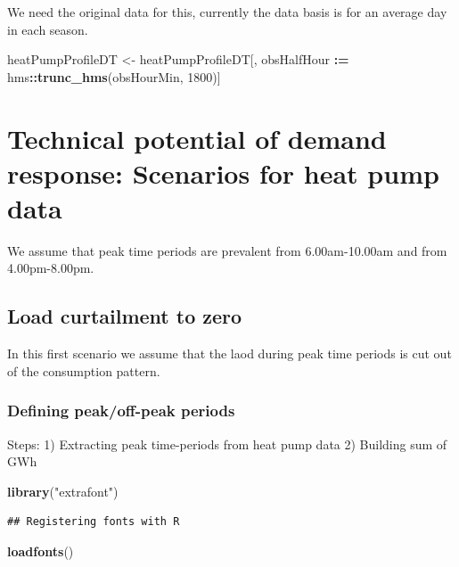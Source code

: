 \documentclass[]{article}
\newenvironment{Shaded}{\begin{snugshade}}{\end{snugshade}}
\newcommand{\KeywordTok}[1]{\textcolor[rgb]{0.13,0.29,0.53}{\textbf{#1}}}
\newcommand{\DecValTok}[1]{\textcolor[rgb]{0.00,0.00,0.81}{#1}}
\newcommand{\StringTok}[1]{\textcolor[rgb]{0.31,0.60,0.02}{#1}}
\newcommand{\OperatorTok}[1]{\textcolor[rgb]{0.81,0.36,0.00}{\textbf{#1}}}
\newcommand{\ErrorTok}[1]{\textcolor[rgb]{0.64,0.00,0.00}{\textbf{#1}}}
\newcommand{\NormalTok}[1]{#1}
\theoremstyle{definition}
\theoremstyle{definition}
\theoremstyle{definition}
\theoremstyle{remark}
\begin{document}
We need the original data for this, currently the data basis is for an
average day in each season.

\begin{Shaded}
\begin{Highlighting}[]
\NormalTok{heatPumpProfileDT <-}\StringTok{ }\NormalTok{heatPumpProfileDT[, obsHalfHour }\OperatorTok{:}\ErrorTok{=}\StringTok{ }\NormalTok{hms}\OperatorTok{::}\KeywordTok{trunc_hms}\NormalTok{(obsHourMin, }\DecValTok{1800}\NormalTok{)]}
\end{Highlighting}
\end{Shaded}

\section{Technical potential of demand response: Scenarios for heat pump
data}\label{technical-potential-of-demand-response-scenarios-for-heat-pump-data}

We assume that peak time periods are prevalent from 6.00am-10.00am and
from 4.00pm-8.00pm.

\subsection{Load curtailment to zero}\label{load-curtailment-to-zero}

In this first scenario we assume that the laod during peak time periods
is cut out of the consumption pattern.

\subsubsection{Defining peak/off-peak
periods}\label{defining-peakoff-peak-periods}

Steps: 1) Extracting peak time-periods from heat pump data 2) Building
sum of GWh

\begin{Shaded}
\begin{Highlighting}[]
\KeywordTok{library}\NormalTok{(}\StringTok{"extrafont"}\NormalTok{)}
\end{Highlighting}
\end{Shaded}

\begin{verbatim}
## Registering fonts with R
\end{verbatim}

\begin{Shaded}
\begin{Highlighting}[]
\KeywordTok{loadfonts}\NormalTok{()}
\end{Highlighting}
\end{Shaded}
\end{document}
